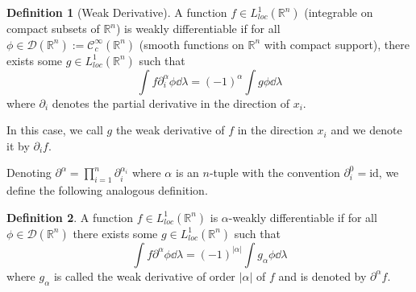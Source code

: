 \documentclass[]{article}
\theoremstyle{definition}
\theoremstyle{definition}
\newtheorem{definition}{Definition}[section]
\begin{document}
\begin{definition}[Weak Derivative]
  A function \(f \in L^1_{loc}(\mathbb{R}^n)\) (integrable on compact subsets of 
  \(\mathbb{R}^n\)) is weakly differentiable if for all 
  \(\phi \in \mathcal{D}(\mathbb{R}^n) := \mathcal{C}^\infty_c(\mathbb{R}^n)\)
  (smooth functions on \(\mathbb{R}^n\) with compact support), 
  there exists some \(g \in L^1_{loc}(\mathbb{R}^n)\) such that 
  \[\int f \partial^\alpha_i \phi \dd\lambda = (-1)^\alpha \int g \phi \dd \lambda\]
  where \(\partial_i\) denotes the partial derivative in the direction of \(x_i\).

  In this case, we call \(g\) the weak derivative of \(f\) in the direction \(x_i\) 
  and we denote it by \(\partial_i f\).
\end{definition}

Denoting \(\partial^\alpha = \prod_{i = 1}^n \partial_i^{\alpha_i}\) where \(\alpha\) 
is an \(n\)-tuple with the convention \(\partial_i^0 = \text{id}\), we define 
the following analogous definition.

\begin{definition}
  A function \(f \in L^1_{loc}(\mathbb{R}^n)\) is \(\alpha\)-weakly differentiable 
  if for all \(\phi \in \mathcal{D}(\mathbb{R}^n)\) there exists some 
  \(g \in L^1_{loc}(\mathbb{R}^n)\) such that 
  \[\int f \partial^\alpha \phi \dd \lambda = (-1)^{|\alpha|} \int g_\alpha \phi \dd \lambda\]
  where \(g_\alpha\) is called the weak derivative of order \(|\alpha|\) of \(f\) 
  and is denoted by \(\partial^\alpha f\).
\end{definition}
\end{document}
